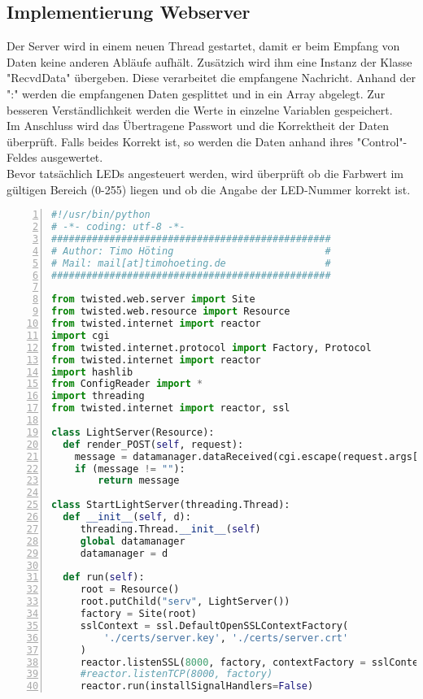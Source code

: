 \subsection{Implementierung Webserver}
Der Server wird in einem neuen Thread gestartet, damit er beim Empfang von Daten keine anderen Abläufe aufhält. Zusätzich wird ihm eine Instanz der Klasse "RecvdData" übergeben. Diese verarbeitet die empfangene Nachricht. 
Anhand der ":" werden die empfangenen Daten gesplittet und in ein Array abgelegt. Zur besseren Verständlichkeit werden die Werte in einzelne Variablen gespeichert. \\
Im Anschluss wird das Übertragene Passwort und die Korrektheit der Daten überprüft. Falls beides Korrekt ist, so werden die Daten anhand ihres "Control"-Feldes ausgewertet. \\
Bevor tatsächlich LEDs angesteuert werden, wird überprüft ob die Farbwert im gültigen Bereich (0-255) liegen und ob die Angabe der LED-Nummer korrekt ist.\\

\begin{lstlisting}[caption =Implementierung des Webservers in Python, language=python, frame=single, breaklines=true,columns=fullflexible, commentstyle=\color{gray}\upshape, captionpos=b, numbers = left]
#!/usr/bin/python
# -*- coding: utf-8 -*-
################################################
# Author: Timo Höting       				   #
# Mail: mail[at]timohoeting.de  			   #
################################################

from twisted.web.server import Site
from twisted.web.resource import Resource
from twisted.internet import reactor
import cgi
from twisted.internet.protocol import Factory, Protocol
from twisted.internet import reactor
import hashlib
from ConfigReader import *
import threading
from twisted.internet import reactor, ssl

class LightServer(Resource):
  def render_POST(self, request):
    message = datamanager.dataReceived(cgi.escape(request.args["data"][0]))
    if (message != ""):
        return message

class StartLightServer(threading.Thread):
  def __init__(self, d):
     threading.Thread.__init__(self)
     global datamanager
     datamanager = d

  def run(self):
     root = Resource()
     root.putChild("serv", LightServer())
     factory = Site(root)
     sslContext = ssl.DefaultOpenSSLContextFactory(
         './certs/server.key', './certs/server.crt'
     )
     reactor.listenSSL(8000, factory, contextFactory = sslContext)
     #reactor.listenTCP(8000, factory)
     reactor.run(installSignalHandlers=False)
\end{lstlisting}

